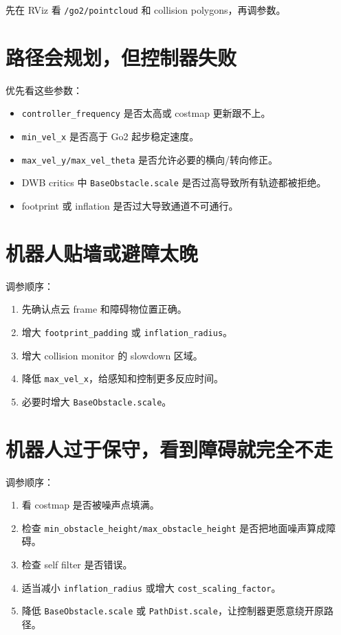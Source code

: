 \documentclass[UTF8,11pt,a4paper,openany]{ctexrep}
\newcommand{\topic}[1]{\nolinkurl{#1}}
\newcommand{\param}[1]{\nolinkurl{#1}}
\begin{document}
先在 RViz 看 \topic{/go2/pointcloud} 和 collision polygons，再调参数。

\section{路径会规划，但控制器失败}

优先看这些参数：

\begin{itemize}
  \item \param{controller_frequency} 是否太高或 costmap 更新跟不上。
  \item \param{min_vel_x} 是否高于 Go2 起步稳定速度。
  \item \param{max_vel_y/max_vel_theta} 是否允许必要的横向/转向修正。
  \item DWB critics 中 \param{BaseObstacle.scale} 是否过高导致所有轨迹都被拒绝。
  \item footprint 或 inflation 是否过大导致通道不可通行。
\end{itemize}

\section{机器人贴墙或避障太晚}

调参顺序：

\begin{enumerate}
  \item 先确认点云 frame 和障碍物位置正确。
  \item 增大 \param{footprint_padding} 或 \param{inflation_radius}。
  \item 增大 collision monitor 的 slowdown 区域。
  \item 降低 \param{max_vel_x}，给感知和控制更多反应时间。
  \item 必要时增大 \param{BaseObstacle.scale}。
\end{enumerate}

\section{机器人过于保守，看到障碍就完全不走}

调参顺序：

\begin{enumerate}
  \item 看 costmap 是否被噪声点填满。
  \item 检查 \param{min_obstacle_height/max_obstacle_height} 是否把地面噪声算成障碍。
  \item 检查 self filter 是否错误。
  \item 适当减小 \param{inflation_radius} 或增大 \param{cost_scaling_factor}。
  \item 降低 \param{BaseObstacle.scale} 或 \param{PathDist.scale}，让控制器更愿意绕开原路径。
\end{enumerate}
\end{document}
